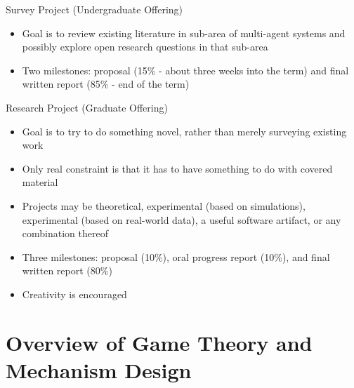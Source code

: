 \documentclass[11pt,aspectratio=169]{beamer}
\begin{document}
  \begin{frame}{Survey Project (Undergraduate Offering)}
   \begin{itemize}
   \setlength{\itemsep}{1em}
    \item Goal is to review existing literature in sub-area of multi-agent systems and possibly explore open research questions in that sub-area
    \item Two milestones: proposal (15\% - about three weeks into the term) and final written report (85\% - end of the term)
   \end{itemize}
  \end{frame}
 
  \begin{frame}{Research Project (Graduate Offering)}
   \begin{itemize}
   \setlength{\itemsep}{1em}
   \item Goal is to try to do something novel, rather than merely surveying existing work
   \item Only real constraint is that it has to have something to do with covered material
   \item Projects may be theoretical, experimental (based on simulations), experimental (based on real-world data), a useful software artifact, or any combination thereof
   \item Three milestones: proposal (10\%), oral progress report (10\%), and final written report (80\%)
   \item Creativity is encouraged
   \end{itemize}
  \end{frame}
 
 \section{Overview of Game Theory and Mechanism Design}
 
\end{document}
